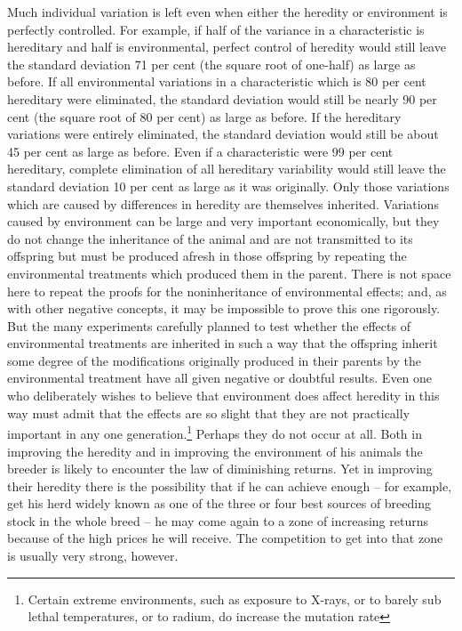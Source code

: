 Much individual variation is left even when either the heredity or
environment is perfectly controlled. For example, if half of the variance
in a characteristic is hereditary and half is environmental, perfect
control of heredity would still leave the standard deviation 71 per cent
(the square root of one-half) as large as before. If all environmental
variations in a characteristic which is 80 per cent hereditary were eliminated,
the standard deviation would still be nearly 90 per cent (the
square root of 80 per cent) as large as before. If the hereditary variations
were entirely eliminated, the standard deviation would still be about 45
per cent as large as before. Even if a characteristic were 99 per cent
hereditary, complete elimination of all hereditary variability would
still leave the standard deviation 10 per cent as large as it was originally.
Only those variations which are caused by differences in heredity
are themselves inherited. Variations caused by environment can be
large and very important economically, but they do not change the
inheritance of the animal and are not transmitted to its offspring but
must be produced afresh in those offspring by repeating the environmental
treatments which produced them in the parent. There is not
space here to repeat the proofs for the noninheritance of environmental
effects; and, as with other negative concepts, it may be impossible to
prove this one rigorously. But the many experiments carefully planned
to test whether the effects of environmental treatments are inherited in
such a way that the offspring inherit some degree of the modifications
originally produced in their parents by the environmental treatment
have all given negative or doubtful results. Even one who deliberately
wishes to believe that environment does affect heredity in this way must
admit that the effects are so slight that they are not practically important
in any one generation.\footnote{Certain extreme environments, such as exposure
to X-rays, or to barely sub lethal temperatures, or to radium, do increase
the mutation rate} Perhaps they do not occur at all. Both in improving the
heredity and in improving the environment of his animals the breeder is likely
to encounter the law of diminishing returns. Yet in improving their heredity
there is the possibility that if he can achieve enough -- for example, get his
herd widely known as one of the three or four best sources of breeding stock
in the whole breed -- he may come again to a zone of increasing returns because
of the high prices he will receive. The competition to get into that zone is
usually very strong, however.

